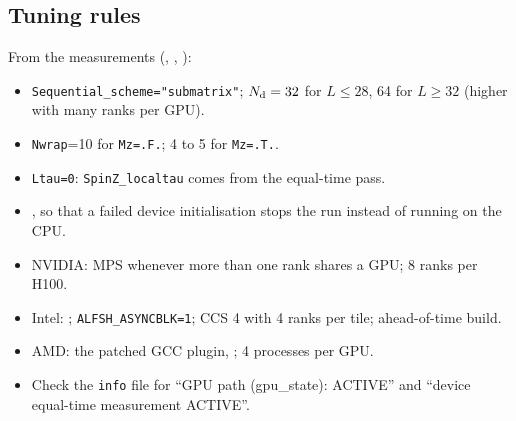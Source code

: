 \subsection{Tuning rules}

From the measurements (, , ):
\begin{itemize}
\item \texttt{Sequential\_scheme="submatrix"}; $N_{\rm d}=32$ for $L\le28$, 64 for $L\ge32$ (higher with many ranks per GPU).
\item \texttt{Nwrap}=10 for \texttt{Mz=.F.}; 4 to 5 for \texttt{Mz=.T.}.
\item \texttt{Ltau=0}: \texttt{SpinZ\_localtau} comes from the equal-time pass.
\item {}, so that a failed device initialisation stops the run instead of running on the CPU.
\item NVIDIA: MPS whenever more than one rank shares a GPU; 8 ranks per H100.
\item Intel: ; \texttt{ALFSH\_ASYNCBLK=1}; CCS 4 with 4 ranks per tile; ahead-of-time build.
\item AMD: the patched GCC plugin, ; 4 processes per GPU.
\item Check the \texttt{info} file for ``GPU path (gpu\_state): ACTIVE'' and ``device equal-time measurement ACTIVE''.
\end{itemize}
